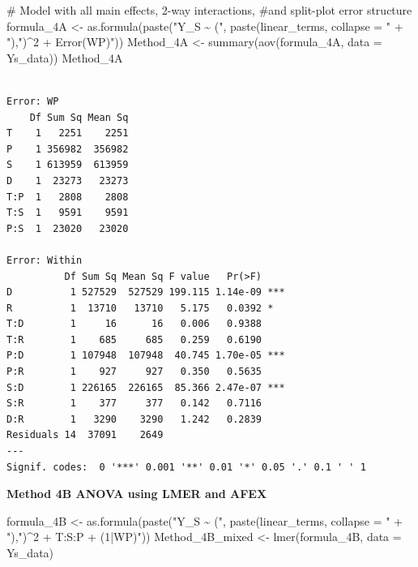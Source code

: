\documentclass[
  letterpaper,
  DIV=11,
  numbers=noendperiod]{scrartcl}
\newenvironment{Shaded}{\begin{snugshade}}{\end{snugshade}}
\newcommand{\AttributeTok}[1]{\textcolor[rgb]{0.40,0.45,0.13}{#1}}
\newcommand{\CommentTok}[1]{\textcolor[rgb]{0.37,0.37,0.37}{#1}}
\newcommand{\FunctionTok}[1]{\textcolor[rgb]{0.28,0.35,0.67}{#1}}
\newcommand{\NormalTok}[1]{\textcolor[rgb]{0.00,0.23,0.31}{#1}}
\newcommand{\OtherTok}[1]{\textcolor[rgb]{0.00,0.23,0.31}{#1}}
\newcommand{\StringTok}[1]{\textcolor[rgb]{0.13,0.47,0.30}{#1}}
\begin{document}
\begin{Shaded}
\begin{Highlighting}[]
\CommentTok{\# Model with all main effects, 2{-}way interactions,}
\CommentTok{\#and split{-}plot error structure}
\NormalTok{formula\_4A }\OtherTok{\textless{}{-}} \FunctionTok{as.formula}\NormalTok{(}\FunctionTok{paste}\NormalTok{(}\StringTok{"Y\_S \textasciitilde{} ("}\NormalTok{, }
    \FunctionTok{paste}\NormalTok{(linear\_terms, }\AttributeTok{collapse =} \StringTok{" + "}\NormalTok{),}\StringTok{")\^{}2 + Error(WP)"}\NormalTok{))}
\NormalTok{Method\_4A }\OtherTok{\textless{}{-}} \FunctionTok{summary}\NormalTok{(}\FunctionTok{aov}\NormalTok{(formula\_4A, }\AttributeTok{data =}\NormalTok{ Ys\_data))}
\NormalTok{Method\_4A}
\end{Highlighting}
\end{Shaded}

\begin{verbatim}

Error: WP
    Df Sum Sq Mean Sq
T    1   2251    2251
P    1 356982  356982
S    1 613959  613959
D    1  23273   23273
T:P  1   2808    2808
T:S  1   9591    9591
P:S  1  23020   23020

Error: Within
          Df Sum Sq Mean Sq F value   Pr(>F)    
D          1 527529  527529 199.115 1.14e-09 ***
R          1  13710   13710   5.175   0.0392 *  
T:D        1     16      16   0.006   0.9388    
T:R        1    685     685   0.259   0.6190    
P:D        1 107948  107948  40.745 1.70e-05 ***
P:R        1    927     927   0.350   0.5635    
S:D        1 226165  226165  85.366 2.47e-07 ***
S:R        1    377     377   0.142   0.7116    
D:R        1   3290    3290   1.242   0.2839    
Residuals 14  37091    2649                     
---
Signif. codes:  0 '***' 0.001 '**' 0.01 '*' 0.05 '.' 0.1 ' ' 1
\end{verbatim}

\textbf{Method 4B ANOVA using LMER and AFEX}

\begin{Shaded}
\begin{Highlighting}[]
\NormalTok{formula\_4B }\OtherTok{\textless{}{-}} \FunctionTok{as.formula}\NormalTok{(}\FunctionTok{paste}\NormalTok{(}\StringTok{"Y\_S \textasciitilde{} ("}\NormalTok{, }
    \FunctionTok{paste}\NormalTok{(linear\_terms, }\AttributeTok{collapse =} \StringTok{" + "}\NormalTok{),}\StringTok{")\^{}2 + T:S:P + (1|WP)"}\NormalTok{))}
\NormalTok{Method\_4B\_mixed }\OtherTok{\textless{}{-}} \FunctionTok{lmer}\NormalTok{(formula\_4B, }\AttributeTok{data =}\NormalTok{ Ys\_data)}
\end{Highlighting}
\end{Shaded}
\end{document}
